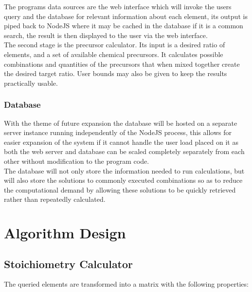 \documentclass[a4paper, 12pt]{article}
\begin{document}
The programs data sources are the web interface which will invoke the users query and the database for relevant information about each element, its output is piped back to NodeJS where it may be cached in the database if it is a common search, the result is then displayed to the user via the web interface. \\

The second stage is the precursor calculator. Its input is a desired ratio of elements, and a set of available chemical precursors. It calculates possible combinations and quantities of the precursors that when mixed together create the desired target ratio. User bounds may also be given to keep the results practically usable.


\subsubsection{Database}
With the theme of future expansion the database will be hosted on a separate server instance running independently of the NodeJS process, this allows for easier expansion of the system if it cannot handle the user load placed on it as both the web server and database can be scaled completely separately from each other without modification to the program code. \\ 

The database will not only store the information needed to run calculations, but will also store the solutions to commonly executed combinations so as to reduce the computational demand by allowing these solutions to be quickly retrieved rather than repeatedly calculated.

\section{Algorithm Design}
\subsection{Stoichiometry Calculator}
The queried elements are transformed into a matrix with the following properties:
\end{document}
